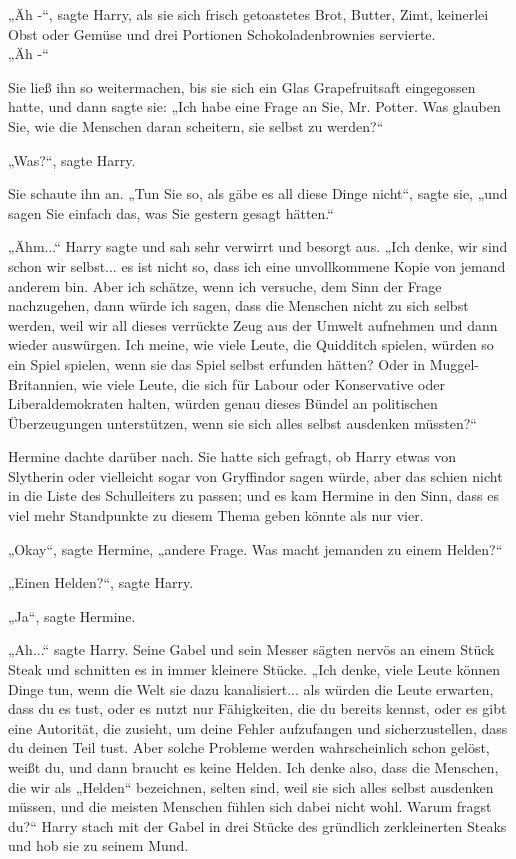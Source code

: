 {„Äh -“, sagte Harry, als sie sich frisch getoastetes Brot, Butter, Zimt, keinerlei Obst oder Gemüse und drei Portionen Schokoladenbrownies servierte.\\ „Äh -“

Sie ließ ihn so weitermachen, bis sie sich ein Glas Grapefruitsaft eingegossen hatte, und dann sagte sie: „Ich habe eine Frage an Sie, Mr. Potter. Was glauben Sie, wie die Menschen daran scheitern, sie selbst zu werden?“

„Was?“, sagte Harry.

Sie schaute ihn an. „Tun Sie so, als gäbe es all diese Dinge nicht“, sagte sie, „und sagen Sie einfach das, was Sie gestern gesagt hätten.“

„Ähm...“ Harry sagte und sah sehr verwirrt und besorgt aus. „Ich denke, wir sind schon wir selbst... es ist nicht so, dass ich eine unvollkommene Kopie von jemand anderem bin. Aber ich schätze, wenn ich versuche, dem Sinn der Frage nachzugehen, dann würde ich sagen, dass die Menschen nicht zu sich selbst werden, weil wir all dieses verrückte Zeug aus der Umwelt aufnehmen und dann wieder auswürgen. Ich meine, wie viele Leute, die Quidditch spielen, würden so ein Spiel spielen, wenn sie das Spiel selbst erfunden hätten? Oder in Muggel-Britannien, wie viele Leute, die sich für Labour oder Konservative oder Liberaldemokraten halten, würden genau dieses Bündel an politischen Überzeugungen unterstützen, wenn sie sich alles selbst ausdenken müssten?“

Hermine dachte darüber nach. Sie hatte sich gefragt, ob Harry etwas von Slytherin oder vielleicht sogar von Gryffindor sagen würde, aber das schien nicht in die Liste des Schulleiters zu passen; und es kam Hermine in den Sinn, dass es viel mehr Standpunkte zu diesem Thema geben könnte als nur vier.

„Okay“, sagte Hermine, „andere Frage. Was macht jemanden zu einem Helden?“

„Einen Helden?“, sagte Harry.

„Ja“, sagte Hermine.

„Ah...“ sagte Harry. Seine Gabel und sein Messer sägten nervös an einem Stück Steak und schnitten es in immer kleinere Stücke. „Ich denke, viele Leute können Dinge tun, wenn die Welt sie dazu kanalisiert... als würden die Leute erwarten, dass du es tust, oder es nutzt nur Fähigkeiten, die du bereits kennst, oder es gibt eine Autorität, die zusieht, um deine Fehler aufzufangen und sicherzustellen, dass du deinen Teil tust. Aber solche Probleme werden wahrscheinlich schon gelöst, weißt du, und dann braucht es keine Helden. Ich denke also, dass die Menschen, die wir als „Helden“ bezeichnen, selten sind, weil sie sich alles selbst ausdenken müssen, und die meisten Menschen fühlen sich dabei nicht wohl. Warum fragst du?“ Harry stach mit der Gabel in drei Stücke des gründlich zerkleinerten Steaks und hob sie zu seinem Mund.

}
